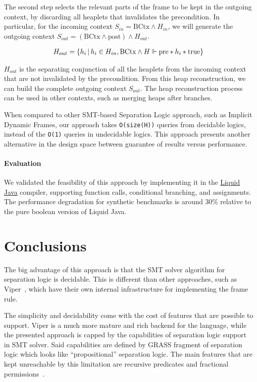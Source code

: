 \documentclass[sigplan,screen,review]{acmart}
\begin{document}
The second step selects the relevant parts of the frame to be kept in the outgoing context, by discarding all heaplets that invalidates the precondition. In particular, for the incoming context $S_{in} = \mbox{BCtx} \wedge H_{in} $, we will generate the outgoing context $S_{out} = (\text{BCtx} \wedge \text{post}) \wedge H_{out} $.


\begin{align*}
H_{out} = \* \{ h_i  \,|\, h_i \in H_{in}, \mbox{BCtx} \wedge H \Vdash \mbox{pre} \mathbin{*} h_i  \mathbin{*} \text{true} \}
\end{align*}

$H_{out}$ is the separating conjunction of all the heaplets from the incoming context that are not invalidated by the precondition. From this heap reconstruction, we can build the complete outgoing context $S_{out}$. The heap reconstruction process can be used in other contexts, such as merging heaps after branches.

When compared to other SMT-based Separation Logic approach, such as Implicit Dynamic Frames, our approach takes \texttt{O(size(H))} queries from decidable logics, instead of the \texttt{O(1)} queries in undecidable logics. This approach presents another alternative in the design space between guarantee of results versus performance.

\paragraph{Evaluation} We validated the feasibility of this approach by implementing it in the \href{https://catarinagamboa.github.io/liquidjava.html}{Liquid Java} compiler, supporting function calls, conditional branching, and assignments. The performance degradation for synthetic benchmarks is around 30\% relative to the pure boolean version of Liquid Java.


\section{Conclusions}

The big advantage of this approach is that the SMT solver algorithm for separation logic is decidable. This is different than other approaches, such as Viper~\cite{DBLP:conf/vmcai/0001SS16}, which have their own internal infrastructure for implementing the frame rule.

The simplicity and decidability come with the cost of features that are possible to support. Viper is a much more mature and rich backend for the language, while the presented approach is capped by the capabilities of separation logic support in SMT solver. Said capabilities are defined by GRASS fragment of separation logic which looks like ``propositional'' separation logic. The main features that are kept unreachable by this limitation are recursive predicates and fractional permissions~\cite{DBLP:conf/sas/Boyland03}. 
\end{document}
